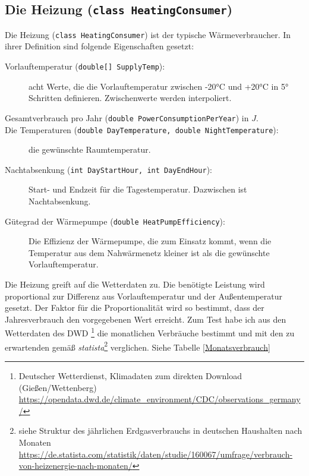 \documentclass[12pt,a4paper]{article}
\begin{document}
\subsection{Die Heizung (\texttt{class HeatingConsumer})}
Die Heizung (\texttt{class HeatingConsumer}) ist der typische Wärmeverbraucher. In ihrer Definition sind folgende Eigenschaften gesetzt:
\begin{description}
\item[Vorlauftemperatur (\texttt{double[] SupplyTemp}):] acht Werte, die die Vorlauftemperatur zwischen -20°C und +20°C in 5° Schritten definieren. Zwischenwerte werden interpoliert.
\item[Gesamtverbrauch pro Jahr (\texttt{double PowerConsumptionPerYear}) in $J$.]
\item[Die Temperaturen (\texttt{double DayTemperature, double NightTemperature}):] die gewünschte Raumtemperatur.
\item[Nachtabsenkung (\texttt{int DayStartHour, int DayEndHour}):]
 Start- und Endzeit für die Tagestemperatur. Dazwischen ist Nachtabsenkung.
\item[Gütegrad der Wärmepumpe (\texttt{double HeatPumpEfficiency}):]
Die Effizienz der Wärmepumpe, die zum Einsatz kommt, wenn die Temperatur aus dem Nahwärmenetz kleiner ist als die gewünschte Vorlauftemperatur.
\end{description}
Die Heizung greift auf die Wetterdaten zu. Die benötigte Leistung wird proportional zur Differenz aus Vorlauftemperatur und der Außentemperatur gesetzt. Der Faktor für die Proportionalität wird  so bestimmt, dass der Jahresverbrauch den vorgegebenen Wert erreicht. Zum Test habe ich aus den Wetterdaten des DWD \footnote{Deutscher Wetterdienst, Klimadaten zum direkten Download (Gießen/Wettenberg) \url{https://opendata.dwd.de/climate_environment/CDC/observations_germany/}} die monatlichen Verbräuche bestimmt und mit den zu erwartenden gemäß \emph{statista}\footnote{siehe Struktur des jährlichen Erdgasverbrauchs in deutschen Haushalten nach Monaten \url{https://de.statista.com/statistik/daten/studie/160067/umfrage/verbrauch-von-heizenergie-nach-monaten/}} verglichen. Siehe Tabelle \ref{Monatsverbrauch}
\end{document}

